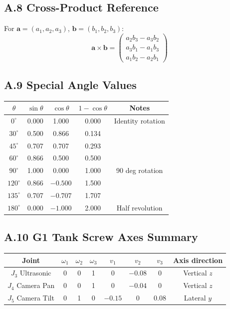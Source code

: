 \documentclass[12pt,a4paper]{article}
\newcommand{\vect}[1]{\bm{#1}}
\begin{document}
\subsection*{A.8 \quad Cross-Product Reference}
For $\vect{a}=(a_1,a_2,a_3)$, $\vect{b}=(b_1,b_2,b_3)$:
\[
  \vect{a}\times\vect{b}
  = \begin{pmatrix}a_2b_3-a_3b_2\\ a_3b_1-a_1b_3\\ a_1b_2-a_2b_1\end{pmatrix}
\]

\subsection*{A.9 \quad Special Angle Values}
\begin{center}
\renewcommand{\arraystretch}{1.3}
\begin{tabular}{ccccc}
\toprule
$\theta$ & $\sin\theta$ & $\cos\theta$ & $1-\cos\theta$ & Notes \\
\midrule
$0^\circ$   & 0.000 & 1.000 & 0.000 & Identity rotation \\
$30^\circ$  & 0.500 & 0.866 & 0.134 & \\
$45^\circ$  & 0.707 & 0.707 & 0.293 & \\
$60^\circ$  & 0.866 & 0.500 & 0.500 & \\
$90^\circ$  & 1.000 & 0.000 & 1.000 & 90 deg rotation \\
$120^\circ$ & 0.866 &$-0.500$& 1.500 & \\
$135^\circ$ & 0.707 &$-0.707$& 1.707 & \\
$180^\circ$ & 0.000 &$-1.000$& 2.000 & Half revolution \\
\bottomrule
\end{tabular}
\end{center}

\subsection*{A.10 \quad G1 Tank Screw Axes Summary}
\begin{center}
\renewcommand{\arraystretch}{1.4}
\begin{tabular}{cccccccc}
\toprule
\textbf{Joint} & $\omega_1$ & $\omega_2$ & $\omega_3$ &
                 $v_1$ & $v_2$ & $v_3$ & \textbf{Axis direction} \\
\midrule
$J_3$ Ultrasonic & 0 & 0 & 1 & 0      & $-0.08$ & 0      & Vertical $z$ \\
$J_4$ Camera Pan & 0 & 0 & 1 & 0      & $-0.04$ & 0      & Vertical $z$ \\
$J_5$ Camera Tilt& 0 & 1 & 0 & $-0.15$& 0       & $0.08$ & Lateral $y$  \\
\bottomrule
\end{tabular}
\end{center}
\end{document}
